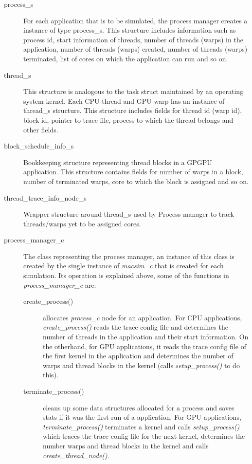 \begin{description}


\item [process\_s] For each application that is to be simulated, the process manager
creates a instance of type process\_s. This structure includes information such
as process id, start information of threads, number of threads (warps) in
the application, number of threads (warps) created, number of threads (warps)
  terminated, list of cores on which the application can run and so on.

\item [thread\_s] This structure is analogous to the task struct maintained by
an operating system kernel. Each CPU thread and GPU warp has an instance of
thread\_s structure. This structure includes fields for thread id (warp id),
  block id, pointer to trace file, process to which the thread belongs and
  other fields. 

\item [block\_schedule\_info\_s] Bookkeeping structure representing thread blocks in
a GPGPU application. This structure contains fields for number of warps in a
block, number of terminated warps, core to which the block is assigned and so
on.

\item [thread\_trace\_info\_node\_s] Wrapper structure around thread\_s used by
Process manager to track threads/warps yet to be assigned cores.


\item [process\_manager\_c] The class representing the process manager, an
instance of this class is created by the single instance of \textit{macsim\_c}
that is created for each simulation. Its operation is explained above, some of
the functions in \textit{process\_manager\_c} are:
\begin{description}

\item [create\_process()] allocates \textit{process\_c} node for an
application. For CPU applications, \textit{create\_process()} reads the trace
config file and determines the number of threads in the application and their
start information. On the otherhand, for GPU applications, it reads the trace
config file of the first kernel in the application and determines the number of
warps and thread blocks in the kernel (calls \textit{setup\_process()} to do this).

\item [terminate\_process()] cleans up some data structures allocated for a
process and saves stats if it was the first run of a application. For GPU
applications, \textit{terminate\_process()}  terminates a kernel and calls
\textit{setup\_process()} which traces the trace config file for the next
kernel, determines the number warps and thread blocks in the kernel and calls
\textit{create\_thread\_node()}.


\end{description}
\end{description}
